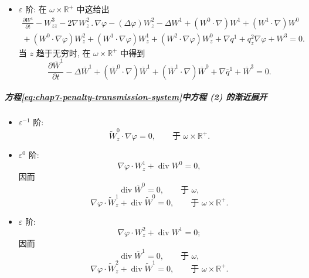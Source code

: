 \begin{sloppypar}
\begin{itemize}
\item $\varepsilon$ 阶:
在 $\omega\times\mathbb R^+$ 中这给出
\[
\begin{split}
 \frac{\partial W^1}{\partial t}-W^3_{zz}-2\nabla W^2_z\mathbin{.}\nabla\varphi
 -(\Delta\varphi)W^2_z-\Delta W^1+(W^0\cdot\nabla)W^1+(W^1\cdot\nabla)W^0\\
 {}+(W^0\cdot\nabla\varphi)W^2_z+(W^1\cdot\nabla\varphi)W^1_z
 +(W^2\cdot\nabla\varphi)W^0_z+\nabla q^1+q^2_z\nabla\varphi+W^3=0.
\end{split}
\]
当 $z$ 趋于无穷时, 在 $\omega\times\mathbb R^+$ 中得到
\begin{equation}
 \frac{\partial\overline W^1}{\partial t}-\Delta\overline W^1
 +(\overline W^0\cdot\nabla)\overline W^1
 +(\overline W^1\cdot\nabla)\overline W^0
 +\nabla\overline q^1+\overline W^3=0.
\label{eq:chap7-interior-W3-equation}
\end{equation}
\end{itemize}

\subparagraph{方程\eqref{eq:chap7-penalty-transmission-system}中方程 (2) 的渐近展开}

\begin{itemize}
\item $\varepsilon^{-1}$ 阶:
\begin{equation}
 \widetilde W^0_z\cdot\nabla\varphi=0,
 \qquad\text{于 }\omega\times\mathbb R^+.
\label{eq:chap7-boundary-W0-normal-zero}
\end{equation}

\item $\varepsilon^0$ 阶:
\[
 \nabla\varphi\cdot W^1_z+\operatorname{div}W^0=0,
\]
因而
\begin{equation}
 \operatorname{div}\overline W^0=0,\qquad\text{于 }\omega,
\label{eq:chap7-interior-W0-divergence}
\end{equation}
\begin{equation}
 \nabla\varphi\cdot\widetilde W^1_z+\operatorname{div}\widetilde W^0=0,
 \qquad\text{于 }\omega\times\mathbb R^+.
\label{eq:chap7-boundary-W1-divergence}
\end{equation}

\item $\varepsilon$ 阶:
\[
 \nabla\varphi\cdot W^2_z+\operatorname{div}W^1=0;
\]
因而
\begin{equation}
 \operatorname{div}\overline W^1=0,\qquad\text{于 }\omega,
\label{eq:chap7-interior-W1-divergence}
\end{equation}
\begin{equation}
 \nabla\varphi\cdot\widetilde W^2_z+\operatorname{div}\widetilde W^1=0,
 \qquad\text{于 }\omega\times\mathbb R^+.
\label{eq:chap7-boundary-W2-divergence}
\end{equation}


\end{itemize}
\end{sloppypar}
